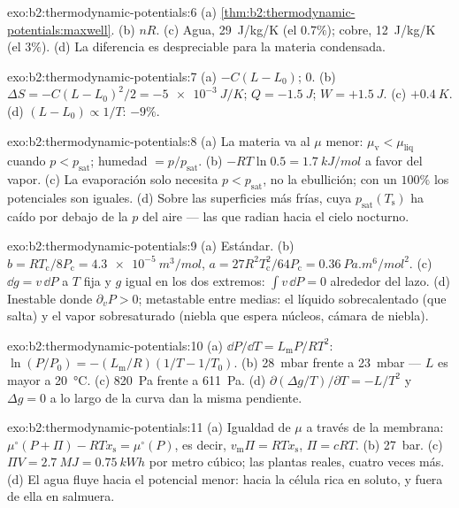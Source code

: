 \begin{solution}{exo:b2:thermodynamic-potentials:6}
(a) \cref{thm:b2:thermodynamic-potentials:maxwell}. (b) $nR$. (c) Agua,
\qty{29}{J/kg/K} (el $0.7\%$); cobre, \qty{12}{J/kg/K} (el $3\%$). (d) La
diferencia es despreciable para la materia condensada.
\end{solution}

\begin{solution}{exo:b2:thermodynamic-potentials:7}
(a) $-C(L - L_0)$; $0$. (b) $\Delta S = -C(L - L_0)^2/2 = \qty{-5e-3}{J/K}$; $Q =
\qty{-1.5}{J}$; $W = +\qty{1.5}{J}$. (c) $+\qty{0.4}{K}$. (d) $(L - L_0) \propto
1/T$: $-9\%$.
\end{solution}

\begin{solution}{exo:b2:thermodynamic-potentials:8}
(a) La materia va al $\mu$ menor: $\mu_{\text{v}} < \mu_{\text{liq}}$ cuando $p <
p_{\text{sat}}$; humedad $= p/p_{\text{sat}}$. (b) $-RT\ln 0.5 = \qty{1.7}{kJ/mol}$
a favor del vapor. (c) La evaporación solo necesita $p < p_{\text{sat}}$,
no la ebullición; con un $100\%$ los potenciales son iguales. (d) Sobre las superficies
más frías, cuya $p_{\text{sat}}(T_{\text{s}})$ ha caído por debajo de la $p$ del aire
--- las que radian hacia el cielo nocturno.
\end{solution}

\begin{solution}{exo:b2:thermodynamic-potentials:9}
(a) Estándar. (b) $b = RT_{\text{c}}/8P_{\text{c}} = \qty{4.3e-5}{m^3/mol}$, $a =
27R^2T_{\text{c}}^2/64P_{\text{c}} = \qty{0.36}{Pa.m^6/mol^2}$. (c) $\dd g = v\,\dd P$
a $T$ fija y $g$ igual en los dos extremos: $\int v\,\dd P = 0$ alrededor del
lazo. (d) Inestable donde $\partial_vP > 0$; metastable entre medias: el
líquido sobrecalentado (que salta) y el vapor sobresaturado (niebla que
espera núcleos, cámara de niebla).
\end{solution}

\begin{solution}{exo:b2:thermodynamic-potentials:10}
(a) $\dd P/\dd T = L_{\text{m}}P/RT^2$: $\ln(P/P_0) = -(L_{\text{m}}/R)(1/T - 1/T_0)$.
(b) \qty{28}{mbar} frente a \qty{23}{mbar} --- $L$ es mayor a \qty{20}{\celsius}.
(c) \qty{820}{Pa} frente a \qty{611}{Pa}. (d) $\partial(\Delta g/T)/\partial T = -L/T^2$
y $\Delta g = 0$ a lo largo de la curva dan la misma pendiente.
\end{solution}

\begin{solution}{exo:b2:thermodynamic-potentials:11}
(a) Igualdad de $\mu$ a través de la membrana: $\mu^\circ(P + \Pi) - RTx_{\text{s}} =
\mu^\circ(P)$, es decir, $v_{\text{m}}\Pi = RTx_{\text{s}}$, $\Pi = cRT$. (b) \qty{27}{bar}.
(c) $\Pi V = \qty{2.7}{MJ} = \qty{0.75}{kWh}$ por metro cúbico; las plantas reales,
cuatro veces más. (d) El agua fluye hacia el potencial menor: hacia la
célula rica en soluto, y fuera de ella en salmuera.
\end{solution}

